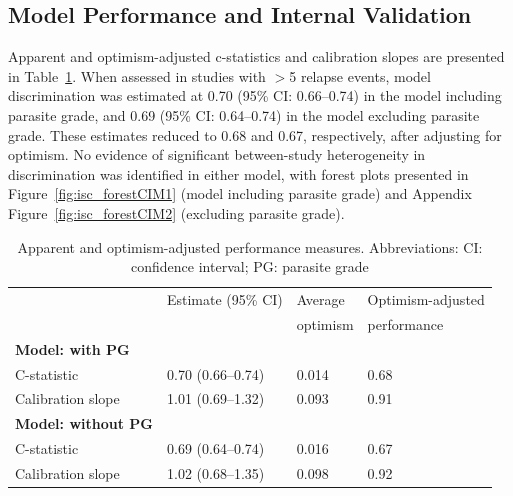\subsection{Model Performance and Internal Validation}

Apparent and optimism-adjusted c-statistics and calibration slopes are presented in Table~\ref{tab:isc_performance}. When assessed in studies with $>$5 relapse events, model discrimination was estimated at 0.70 (95\% CI\@: 0.66--0.74) in the model including parasite grade, and 0.69 (95\% CI\@: 0.64--0.74) in the model excluding parasite grade. These estimates reduced to 0.68 and 0.67, respectively, after adjusting for optimism. No evidence of significant between-study heterogeneity in discrimination was identified in either model, with forest plots presented in Figure~\ref{fig:isc_forestCIM1} (model including parasite grade) and Appendix Figure~\ref{fig:isc_forestCIM2} (excluding parasite grade).

\begin{table}[htbp]
  \begin{tabular}{@{}llll@{}}
    \toprule
                                   & Estimate (95\% CI) & Average  & Optimism-adjusted \\
                                   &                    & optimism & performance       \\
    \midrule
    \textbf{Model: with PG}        &                    &          &                   \\
    \hspace{1em} C-statistic       & 0.70 (0.66--0.74)  & 0.014    & 0.68              \\
    \hspace{1em} Calibration slope & 1.01 (0.69--1.32)  & 0.093    & 0.91              \\        \midrule
    \textbf{Model: without PG}     &                    &          &                   \\
    \hspace{1em} C-statistic       & 0.69 (0.64--0.74)  & 0.016    & 0.67              \\
    \hspace{1em} Calibration slope & 1.02 (0.68--1.35)  & 0.098    & 0.92              \\        \bottomrule
  \end{tabular}
  \caption{Apparent and optimism-adjusted performance measures. Abbreviations: CI: confidence interval; PG: parasite grade}
  \label{tab:isc_performance}
\end{table}


